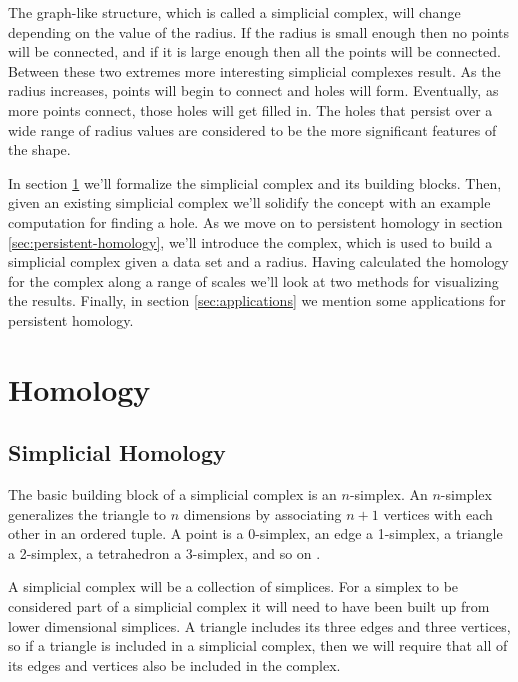 The graph-like structure, which is called a simplicial complex, will change depending on the value of the radius.
If the radius is small enough then no points will be connected, and if it is large enough then all the points will be connected.
Between these two extremes more interesting simplicial complexes result.
As the radius increases, points will begin to connect and holes will form.
Eventually, as more points connect, those holes will get filled in.
The holes that persist over a wide range of radius values are considered to be the more significant features of the shape.

In section \ref{sec:homology} we'll formalize the simplicial complex and its building blocks.
Then, given an existing simplicial complex we'll solidify the concept with an example computation for finding a hole.
As we move on to persistent homology in section \ref{sec:persistent-homology}, we'll introduce the \cech complex, which is used to build a simplicial complex given a data set and a radius.
Having calculated the homology for the \cech complex along a range of scales we'll look at two methods for visualizing the results.
Finally, in section \ref{sec:applications} we mention some applications for persistent homology.

\section{Homology}\label{sec:homology}

\subsection{Simplicial Homology}\label{sec:simplicial-homology}

The basic building block of a simplicial complex is an \(n\)-simplex. %
An \(n\)-simplex generalizes the triangle to \(n\) dimensions by associating \(n+1\) vertices with each other in an ordered tuple.
A point is a 0-simplex, an edge a 1-simplex, a triangle a 2-simplex, a tetrahedron a 3-simplex, and so on .

\begin{figure}
    
    \caption{}
    \label{fig:basic-simplices}
\end{figure}

A simplicial complex will be a collection of simplices.
For a simplex to be considered part of a simplicial complex it will need to have been built up from lower dimensional simplices.
A triangle includes its three edges and three vertices, so if a triangle is included in a simplicial complex, then we will require that all of its edges and vertices also be included in the complex.

